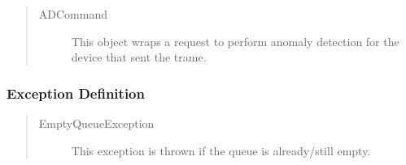 \begin{quote}
	\begin{description}
		\item[ADCommand] This object wraps a request to perform anomaly detection for
		the device that sent the trame.	
	\end{description} 
\end{quote}

\subsubsection{Exception Definition}

\begin{quote}
	\begin{description}
		\item[EmptyQueueException] This exception is thrown if the queue is
		already/still empty.
	\end{description} 
\end{quote}

